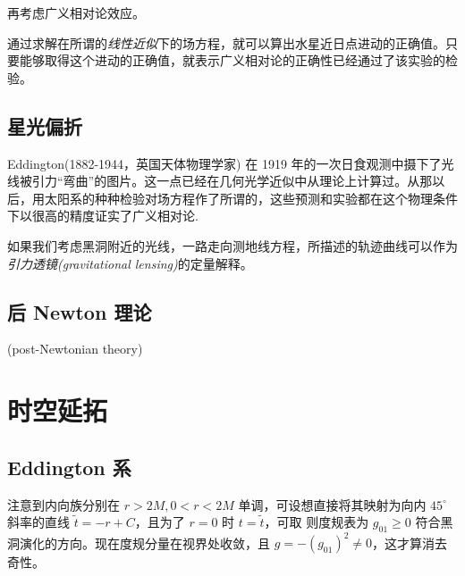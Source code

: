 再考虑广义相对论效应。

通过求解在所谓的\textit{线性近似}下的场方程，就可以算出水星近日点进动的正确值。只要能够取得这个进动的正确值，就表示广义相对论的正确性已经通过了该实验的检验。



\subsection{星光偏折}
Eddington(1882-1944，英国天体物理学家) 在 1919 年的一次日食观测中摄下了光线被引力“弯曲”的图片。这一点已经在几何光学近似中从理论上计算过。从那以后，用太阳系的种种检验对场方程作了所谓的，这些预测和实验都在这个物理条件下以很高的精度证实了广义相对论.

如果我们考虑黑洞附近的光线，一路走向测地线方程，所描述的轨迹曲线可以作为\textit{引力透镜(gravitational lensing)}的定量解释。

\subsection{后 Newton 理论}

(post-Newtonian theory)

\section{时空延拓}

\subsection{Eddington 系}

注意到内向族分别在 $r>2M,0<r<2M$ 单调，可设想直接将其映射为向内 $45^\circ$ 斜率的直线 $\tilde t=-r+C$，且为了 $r=0$ 时 $t=\tilde t$，可取
则度规表为
$g_{01}\geqslant 0$ 符合黑洞演化的方向。现在度规分量在视界处收敛，且 $g=-(g_{01})^2\ne 0$，这才算消去奇性。


